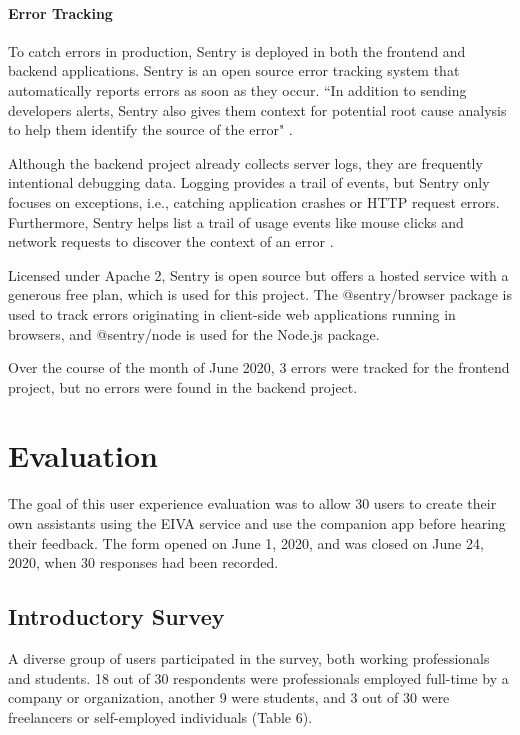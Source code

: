 \documentclass{article}
\begin{document}
\paragraph{Error Tracking}

To catch errors in production, Sentry is deployed in both the frontend and backend applications. Sentry is an open source error tracking system \cite{noauthor_sentry_nodate} that automatically reports errors as soon as they occur. ``In addition to sending developers alerts, Sentry also gives them context for potential root cause analysis to help them identify the source of the error" \cite{noauthor_sentry_nodate-1}.

Although the backend project already collects server logs, they are frequently intentional debugging data. Logging provides a trail of events, but Sentry only focuses on exceptions, i.e., catching application crashes or HTTP request errors. Furthermore, Sentry helps list a trail of usage events like mouse clicks and network requests to discover the context of an error \cite{noauthor_sentry_nodate-2}.

Licensed under Apache 2, Sentry is open source but offers a hosted service with a generous free plan, which is used for this project. The @sentry/browser package is used to track errors originating in client-side web applications running in browsers, and @sentry/node is used for the Node.js package.

Over the course of the month of June 2020, 3 errors were tracked for the frontend project, but no errors were found in the backend project.

\newpage

\section{Evaluation}

The goal of this user experience evaluation was to allow 30 users to create their own assistants using the EIVA service and use the companion app before hearing their feedback. The form opened on June 1, 2020, and was closed on June 24, 2020, when 30 responses had been recorded.

\subsection{Introductory Survey}

A diverse group of users participated in the survey, both working professionals and students. 18 out of 30 respondents were professionals employed full-time by a company or organization, another 9 were students, and 3 out of 30 were freelancers or self-employed individuals (Table 6).
\end{document}

